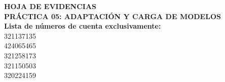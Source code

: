 \documentclass[letterpaper, 11pt]{article}
\newcommand{\numPractica}{05}
\newcommand{\tituloPractica}{Adaptación y Carga de Modelos}
\newcommand{\cuentasEvidencias}{
    321137135 \\ 
    424065465 \\ 
    321258173 \\ 
    321150503 \\ 
    320224159 \\ 
}
\begin{document}


\newpage
{}
\setcounter{page}{2}

\begin{center}
    {\Large\bfseries HOJA DE EVIDENCIAS}\\[0.35cm]
    {\large\bfseries PRÁCTICA \numPractica: \MakeUppercase{\tituloPractica}}\\[0.35cm]
    \textbf{Lista de números de cuenta exclusivamente:}\\
    \cuentasEvidencias
\end{center}
\vspace{0.6cm}
\newpage









\end{document}
